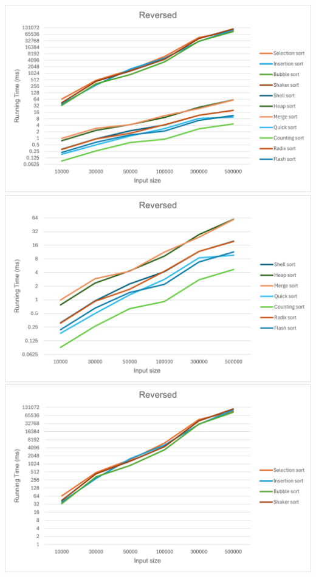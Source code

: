     \includegraphics[width = 1\linewidth]{img/experiment/running time/reversed/1.png}
    \includegraphics[width = 1\linewidth]{img/experiment/running time/reversed/2.png}
    \includegraphics[width = 1\linewidth]{img/experiment/running time/reversed/3.png}

